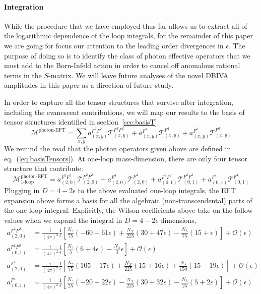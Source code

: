 \documentclass[11pt,letter]{article}
\def\sect#1{section~\ref{#1}}
\def\eqn#1{eq.~(\ref{#1})}
\begin{document}
\paragraph{\textbf{Integration}} While the procedure that we have employed thus far allows us to extract all of the logarithmic dependence of the loop integrals, for the remainder of this paper we are going for focus our attention to the {leading order} divergences in $\epsilon$. The purpose of doing so is to identify the class of photon effective operators that we must add to the Born-Infeld action in order to cancel off anomalous rational terms in the $S$-matrix. We will leave future analyses of the novel DBIVA amplitudes in this paper as a direction of future study. 


In order to capture all the tensor structures that survive after integration, including the evanescent contributions, we will map our results to the basis of tensor structures identified in \sect{sec:basisT}:
\begin{equation}
\mathcal{M}^{\text{photon-EFT}} = \sum_{x,y} a_{(x,y)}^{F^2F^2}\mathcal{T}^{F^2F^2}_{(x,y)}+a_{(x,y)}^{F^4}\mathcal{T}^{F^4}_{(x,y)}+a_{(x,y)}^{F^3}\mathcal{T}^{F^3}_{(x,y)}
\end{equation}
We remind the read that the photon operators given above are defined in \eqn{eq:basisTensors}. At one-loop mass-dimension, there are only four tensor structure that contribute:
\begin{equation}
\mathcal{M}^{\text{photon-EFT}}_{\text{1-loop}} = a_{(2,0)}^{F^2F^2}\mathcal{T}^{F^2F^2}_{(2,0)}+a_{(2,0)}^{F^4}\mathcal{T}^{F^4}_{(2,0)}+a_{(0,1)}^{F^2F^2}\mathcal{T}^{F^2F^2}_{(0,1)}+a_{(0,1)}^{F^4}\mathcal{T}^{F^4}_{(0,1)}
\end{equation}
Plugging in $D=4-2\epsilon$ to the above evaluated one-loop integrals, the EFT expansion above forms a basis for all the algebraic (non-transcendental) parts of the one-loop integral. Explicitly, the Wilson coefficients above take on the follow values when we expand the integral in $D=4-2\epsilon$ dimensions,
\begin{align}
a_{(2,0)}^{F^2F^2}&=\frac{i}{(4\pi)^2}\frac{1}{\epsilon}\left[\frac{N_\gamma }{75}(-60+61\epsilon)+\frac{N_X }{225}(30+47\epsilon)-\frac{N_\lambda }{75}(15+\epsilon)\right]+\mathcal{O}(\epsilon)
\\
a_{(0,1)}^{F^2F^2}&=\frac{i}{(4\pi)^2}\frac{1}{\epsilon}\left[\frac{N_\gamma }{3}(6+4\epsilon)-\frac{N_\lambda}{3}\epsilon\right]+\mathcal{O}(\epsilon)
\\
a_{(2,0)}^{F^4}&=\frac{i}{(4\pi)^2}\frac{1}{\epsilon}\left[\frac{N_\gamma }{75}(105+17\epsilon)+\frac{N_X }{225}(15+16\epsilon)+\frac{N_\lambda }{150}(15-19\epsilon)\right]+\mathcal{O}(\epsilon)
\\
a_{(0,1)}^{F^4}&=\frac{i}{(4\pi)^2}\frac{1}{\epsilon}\left[\frac{N_\gamma }{25}(-20+22\epsilon)-\frac{N_X }{225}(30+32\epsilon)-\frac{N_\lambda }{25}(5+2\epsilon)\right]+\mathcal{O}(\epsilon)
\end{align}
\end{document}
